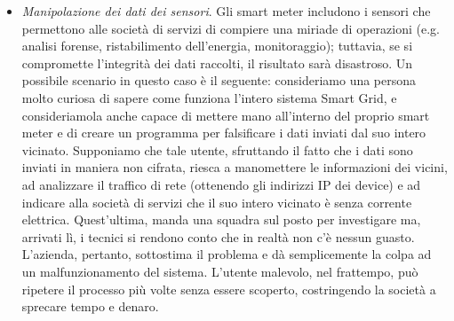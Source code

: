 \begin{itemize}
\item \textit{Manipolazione dei dati dei sensori}. Gli smart meter includono i sensori che permettono alle società di servizi di compiere una miriade di operazioni (e.g. analisi forense, ristabilimento dell'energia, monitoraggio); tuttavia, se si compromette l'integrità dei dati raccolti, il risultato sarà disastroso. Un possibile scenario in questo caso è il seguente: consideriamo una persona molto curiosa di sapere come funziona l'intero sistema Smart Grid, e consideriamola anche capace di mettere mano all'interno del proprio smart meter e di creare un programma per falsificare i dati inviati dal suo intero vicinato. Supponiamo che tale utente, sfruttando il fatto che i dati sono inviati in maniera non cifrata, riesca a manomettere le informazioni dei vicini, ad analizzare il traffico di rete (ottenendo gli indirizzi IP dei device) e ad indicare alla società di servizi che il suo intero vicinato è senza corrente elettrica. Quest'ultima, manda una squadra sul posto per investigare ma, arrivati lì, i tecnici si rendono conto che in realtà non c'è nessun guasto. L'azienda, pertanto, sottostima il problema e dà semplicemente la colpa ad un malfunzionamento del sistema. L'utente malevolo, nel frattempo, può ripetere il processo più volte senza essere scoperto, costringendo la società a sprecare tempo e denaro.
\end{itemize}

